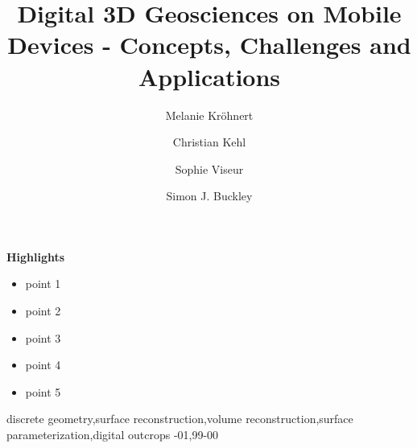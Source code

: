 \documentclass[review]{elsarticle}
\begin{document}
\setlength\emergencystretch{1.5em}

\begin{frontmatter}

\title{Digital 3D Geosciences on Mobile Devices - Concepts, Challenges and Applications}




\author[tudresden]{Melanie Kr\"{o}hnert}

\author[cerege,dtu]{Christian Kehl}


\author[cerege]{Sophie Viseur}

\author[uniresearch,uib]{Simon J. Buckley}

\address[tudresden]{Institute for Photogrammetry \& Remote Sensing, TU Dresden, Helmholtzstr. 10, 01069 Dresden, Germany}
\address[cerege]{Aix Marseille Universit\'{e}, CNRS, IRD, CEREGE UM 34, Dept. Sedimentary and Reservoir Systems, 13001 Marseille, France}
\address[uniresearch]{Uni Research AS -- CIPR, Nyg{\aa}rdsgaten 112, 5008 Bergen, Norway}
\address[uib]{Department of Earth Science, University of Bergen, All\'{e}gaten 41, 5007 Bergen, Norway}
\address[dtu]{}


\begin{abstract}

\end{abstract}

\textbf{Highlights} \\
\begin{itemize}
\item point 1
\item point 2
\item point 3
\item point 4
\item point 5
\end{itemize}

\begin{keyword}
discrete geometry\sep surface reconstruction\sep volume reconstruction\sep surface parameterization\sep digital outcrops
-01\sep  99-00
\end{keyword}

\end{frontmatter}
\end{document}
